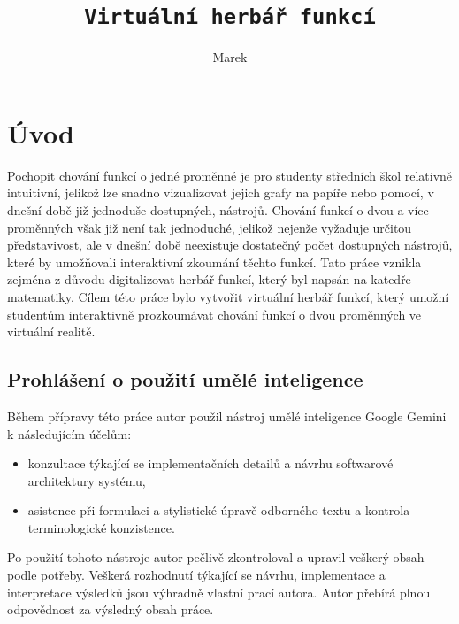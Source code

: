\documentclass[czech, kiv, sem, he, iso690alph, pdf,viewonly]{fasthesis}
\title{\texttt{Virtuální herbář funkcí}}
\author{Marek}{Jirušek}{}{}
\begin{document}
\frontpages[notm]
\tableofcontents


\chapter{Úvod}
Pochopit chování funkcí o jedné proměnné je pro studenty středních škol relativně intuitivní, jelikož lze snadno vizualizovat jejich grafy na papíře nebo pomocí, v dnešní době již jednoduše dostupných, nástrojů.
Chování funkcí o dvou a více proměnných však již není tak jednoduché, jelikož nejenže vyžaduje určitou představivost, ale v dnešní době neexistuje dostatečný počet dostupných nástrojů, které by umožňovali interaktivní zkoumání těchto funkcí.
Tato práce vznikla zejména z důvodu digitalizovat herbář funkcí, který byl napsán na katedře matematiky.
Cílem této práce bylo vytvořit virtuální herbář funkcí, který umožní studentům interaktivně prozkoumávat chování funkcí o dvou proměnných ve virtuální realitě.

\section{Prohlášení o použití umělé inteligence}
Během přípravy této práce autor použil nástroj umělé inteligence Google Gemini k následujícím účelům:
\begin{itemize}
    \item konzultace týkající se implementačních detailů a návrhu softwarové architektury systému,
    \item asistence při formulaci a stylistické úpravě odborného textu a kontrola terminologické konzistence.
\end{itemize}
Po použití tohoto nástroje autor pečlivě zkontroloval a upravil veškerý obsah podle potřeby. 
Veškerá rozhodnutí týkající se návrhu, implementace a interpretace výsledků jsou výhradně vlastní prací autora. Autor přebírá plnou odpovědnost za výsledný obsah práce.
\end{document}
